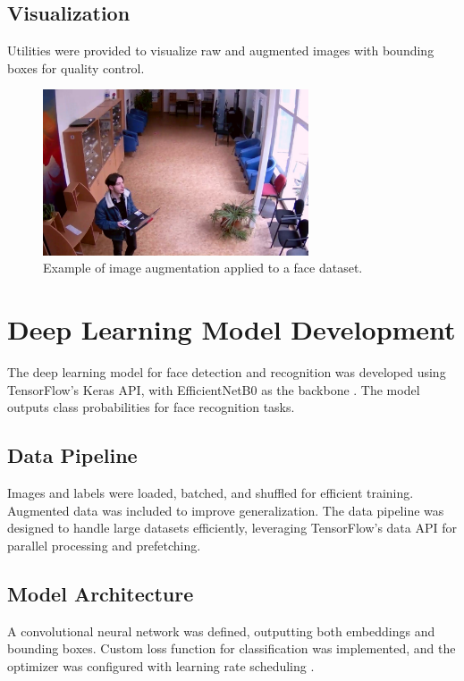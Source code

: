 \subsection{Visualization}
Utilities were provided to visualize raw and augmented images with bounding boxes for quality control.

\begin{figure}[ht!]
    \centering
    \includegraphics[width=0.7\textwidth]{../Files/augmentation_example.jpg}
    \caption{Example of image augmentation applied to a face dataset.}
    \label{fig:augmentation-example}
\end{figure}

\section{Deep Learning Model Development}

The deep learning model for face detection and recognition was developed using TensorFlow's Keras API, with EfficientNetB0 as the backbone \cite{tensorflow}. The model outputs class probabilities for face recognition tasks.

\subsection{Data Pipeline}
Images and labels were loaded, batched, and shuffled for efficient training. Augmented data was included to improve generalization. The data pipeline was designed to handle large datasets efficiently, leveraging TensorFlow's data API for parallel processing and prefetching.

\subsection{Model Architecture}
A convolutional neural network was defined, outputting both embeddings and bounding boxes. Custom loss function for classification was implemented, and the optimizer was configured with learning rate scheduling \cite{schroff2015facenet}.

